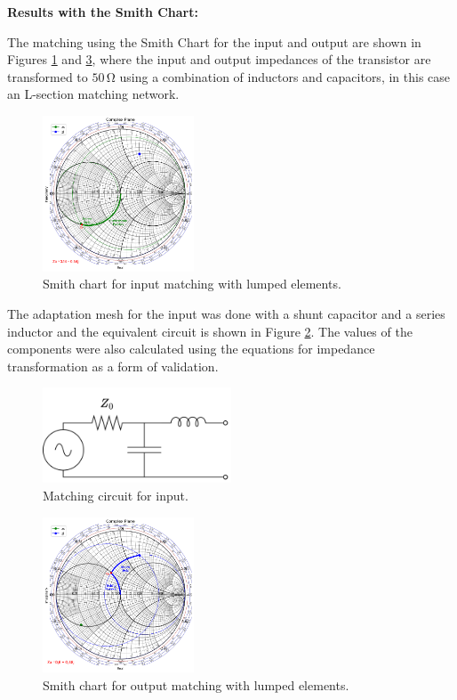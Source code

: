 \vspace{0.4cm}
\textbf{Results with the Smith Chart:}
\vspace{0.4cm}

The matching using the Smith Chart for the input and output are shown in Figures \ref{fig:zs-LC-matching} and \ref{fig:zl-LC-matching}, where the input and output impedances of the transistor are transformed to $50\,\si{\ohm}$ using a combination of inductors and capacitors, in this case an L-section matching network.

\begin{figure}[h]
    \centering
    \includegraphics[width=0.4\textwidth]{Images/zs-lc-match.png}
    \caption{Smith chart for input matching with lumped elements.}
    \label{fig:zs-LC-matching}
\end{figure}

The adaptation mesh for the input was done with a shunt capacitor and a series inductor and the equivalent circuit is shown in Figure \ref{fig:MatchingCircuit-input}. The values of the components were also calculated using the equations for impedance transformation as a form of validation.

\begin{figure}[h]
    \centering
    \includegraphics[width=0.5\textwidth]{Images/Input-matching-circuit.png}
    \caption{Matching circuit for input.}
    \label{fig:MatchingCircuit-input}
\end{figure}

\begin{figure}[h]
    \centering
    \includegraphics[width=0.4\textwidth]{Images/zl-lc-match.png}
    \caption{Smith chart for output matching with lumped elements.}
    \label{fig:zl-LC-matching}
\end{figure}

